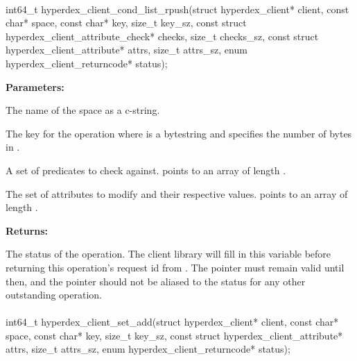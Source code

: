 \paragraph{}
\label{api:c:cond_list_rpush}
\begin{ccode}
int64_t hyperdex_client_cond_list_rpush(struct hyperdex_client* client,
        const char* space,
        const char* key, size_t key_sz,
        const struct hyperdex_client_attribute_check* checks, size_t checks_sz,
        const struct hyperdex_client_attribute* attrs, size_t attrs_sz,
        enum hyperdex_client_returncode* status);
\end{ccode}
\funcdesc 

\noindent\textbf{Parameters:}
\begin{description}[labelindent=\widthof{{\code{checks}, \code{checks\_sz}}},leftmargin=*,noitemsep,nolistsep,align=right]
\item[\code{space}] The name of the space as a c-string.
\item[\code{key}, \code{key\_sz}] The key for the operation where  is a bytestring and  specifies the number of bytes in .
\item[\code{checks}, \code{checks\_sz}] A set of predicates to check against.   points to an array of length .
\item[\code{attrs}, \code{attrs\_sz}] The set of attributes to modify and their respective values.   points to an array of length .
\end{description}

\noindent\textbf{Returns:}
\begin{description}[labelindent=\widthof{{\code{status}}},leftmargin=*,noitemsep,nolistsep,align=right]
\item[\code{status}] The status of the operation.  The client library will fill in this variable before returning this operation's request id from .  The pointer must remain valid until then, and the pointer should not be aliased to the status for any other outstanding operation.
\end{description}

\paragraph{}
\label{api:c:set_add}
\begin{ccode}
int64_t hyperdex_client_set_add(struct hyperdex_client* client,
        const char* space,
        const char* key, size_t key_sz,
        const struct hyperdex_client_attribute* attrs, size_t attrs_sz,
        enum hyperdex_client_returncode* status);
\end{ccode}
\funcdesc 

